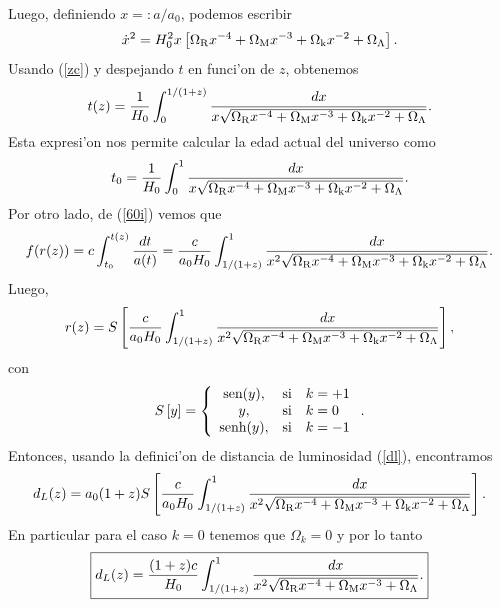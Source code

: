 Luego, definiendo $x=:a/a_0$, podemos escribir 
\begin{equation}
\dot x^2 =H_0^2 x \left[\Omega_{\rm{R}}x^{-4} + \Omega_{\rm{M}}x^{-3}  +\Omega_{\rm{k}}x^{-2} + \Omega_{\rm{\Lambda}}\right].
\end{equation}
Usando (\ref{zc}) y despejando $t$ en funci'on de $z$, obtenemos
\begin{equation}
t(z)=\frac{1}{H_0}\int_0^{1/(1+z)}\frac{dx}{x\sqrt{\Omega_{\rm{R}}x^{-4} + \Omega_{\rm{M}}x^{-3}+\Omega_{\rm{k}}x^{-2} + \Omega_{\rm{\Lambda}} }}.
\end{equation}
Esta expresi'on nos permite calcular la edad actual del universo como
\begin{equation}
t_0=\frac{1}{H_0}\int_0^1\frac{dx}{x\sqrt{\Omega_{\rm{R}}x^{-4} + \Omega_{\rm{M}}x^{-3}+\Omega_{\rm{k}}x^{-2} + \Omega_{\rm{\Lambda}} }}. \label{tiempo}
\end{equation}
Por otro lado, de (\ref{60i}) vemos que
\begin{equation}
f(r(z))=c\int_{t_0}^{t(z)}\frac{dt}{a(t)}= \frac{c}{a_0H_0}\int_{1/(1+z)}^1\frac{dx}{x^2\sqrt{\Omega_{\rm{R}}x^{-4} + \Omega_{\rm{M}}x^{-3}+\Omega_{\rm{k}}x^{-2} + \Omega_{\rm{\Lambda}} }}.
\end{equation}
Luego,
\begin{equation}
r(z)=S\left[\frac{c}{a_0H_0}\int_{1/(1+z)}^1\frac{dx}{x^2\sqrt{\Omega_{\rm{R}}x^{-4} + \Omega_{\rm{M}}x^{-3}+\Omega_{\rm{k}}x^{-2} + \Omega_{\rm{\Lambda}} }}\right],
\end{equation}
con
\begin{equation}
S\left[y\right]=\left\{
\begin{array}
[c]{ccl}%
\text{sen}(y), &\text{si}& k=+1\\
y, &\text{si}& k=0\\
\text{senh}(y), &\text{si}& k=-1
\end{array}
\right. . \label{61i2}%
\end{equation}
Entonces, usando la definici'on de distancia de luminosidad (\ref{dl}), encontramos
\begin{equation}
d_L(z)=a_0(1+z)S\left[\frac{c}{a_0H_0}\int_{1/(1+z)}^1\frac{dx}{x^2\sqrt{\Omega_{\rm{R}}x^{-4} + \Omega_{\rm{M}}x^{-3} +\Omega_{\rm{k}}x^{-2} + \Omega_{\rm{\Lambda}}}}\right]. \label{dlzk}
\end{equation}
En particular para el caso $k=0$ tenemos que $\Omega_k=0$ y por lo tanto
\begin{equation}
\boxed{d_L(z)=\frac{(1+z)c}{H_0}\int_{1/(1+z)}^1\frac{dx}{x^2\sqrt{\Omega_{\rm{R}}x^{-4} + \Omega_{\rm{M}}x^{-3} + \Omega_{\rm{\Lambda}}}}.} \label{dlz}
\end{equation}



